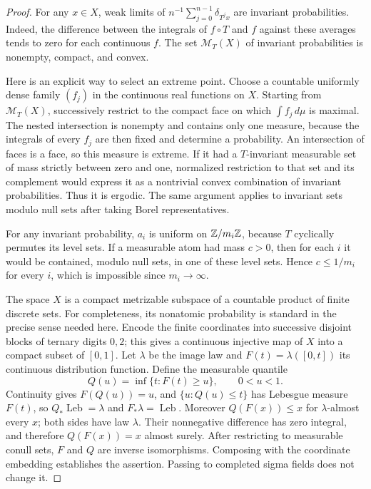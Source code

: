 \begin{proof}
For any $x\in X$, weak limits of
$n^{-1}\sum_{j=0}^{n-1}\delta_{T^jx}$ are invariant probabilities.
Indeed, the difference between the integrals of $f\circ T$ and $f$
against these averages tends to zero for each continuous $f$.
The set $\mathcal M_T(X)$ of invariant probabilities is nonempty,
compact, and convex.

Here is an explicit way to select an extreme point. Choose a
countable uniformly dense family $(f_j)$ in the continuous real
functions on $X$. Starting from $\mathcal M_T(X)$, successively
restrict to the compact face on which $\int f_j\,d\mu$ is maximal.
The nested intersection is nonempty and contains only one measure,
because the integrals of every $f_j$ are then fixed and determine a
probability. An intersection of faces is a face, so this measure is
extreme. If it had a $T$-invariant measurable set of mass strictly
between zero and one, normalized restriction to that set and its
complement would express it as a nontrivial convex combination of
invariant probabilities. Thus it is ergodic. The same argument applies
to invariant sets modulo null sets after taking Borel representatives.

For any invariant probability, $a_i$ is uniform on $\mathbb Z/m_i\mathbb Z$,
because $T$ cyclically permutes its level sets. If a measurable atom
had mass $c>0$, then for each $i$ it would be contained, modulo null
sets, in one of these level sets. Hence $c\le1/m_i$ for every $i$,
which is impossible since $m_i\to\infty$.

The space $X$ is a compact metrizable subspace of a countable product
of finite discrete sets. For completeness, its nonatomic
probability is standard in the precise sense needed here. Encode the
finite coordinates into successive disjoint blocks of ternary
digits $0,2$; this gives a continuous injective map of $X$ into a
compact subset of $[0,1]$. Let $\lambda$ be the image law and
$F(t)=\lambda([0,t])$ its continuous distribution function. Define
the measurable quantile
\[
 Q(u)=\inf\{t:F(t)\ge u\},\qquad 0<u<1.
\]
Continuity gives $F(Q(u))=u$, and
$\{u:Q(u)\le t\}$ has Lebesgue measure $F(t)$, so
$Q_*\operatorname{Leb}=\lambda$ and $F_*\lambda=\operatorname{Leb}$.
Moreover $Q(F(x))\le x$ for $\lambda$-almost every $x$;
both sides have law $\lambda$. Their nonnegative difference has zero
integral, and therefore $Q(F(x))=x$ almost surely.
After restricting to measurable conull sets, $F$ and $Q$ are
inverse isomorphisms. Composing with the coordinate embedding
establishes the assertion. Passing to completed sigma fields
does not change it.


\end{proof}
